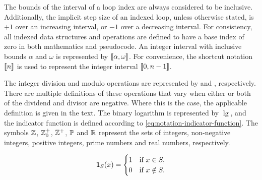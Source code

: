 The bounds of the interval of a loop index are always considered to be inclusive.
Additionally, the implicit step size of an indexed loop, unless otherwise stated, is \( +1 \) over an increasing interval, or \( -1 \) over a decreasing interval.
For consistency, all indexed data structures and operations are defined to have a base index of zero in both mathematics and pseudocode.
An integer interval with inclusive bounds \( \alpha \) and \( \omega \) is represented by \( \llbracket\alpha, \omega\rrbracket \).
For convenience, the shortcut notation \( \llbracket n\rrbracket \) is used to represent the integer interval \( \llbracket0, n - 1\rrbracket \).

The integer division and modulo operations are represented by \Div{} and \Mod{}, respectively.
There are multiple definitions of these operations that vary when either or both of the dividend and divisor are negative.
Where this is the case, the applicable definition is given in the text.
The binary logarithm is represented by \( \lg \), and the indicator function is defined according to \cref{eq:notation-indicator-function}.
The symbols \( \mathbb{Z} \), \( \mathbb{Z}_{0}^{+} \), \( \mathbb{Z}^{+} \), \( \mathbb{P} \) and \( \mathbb{R} \) represent the sets of integers, non-negative integers, positive integers, prime numbers and real numbers, respectively.

\begin{equation}
  \label{eq:notation-indicator-function}
  \operatorname{\mathbf{1}}_{S} (x) = \begin{cases}
    1 & \text{if } x \in S, \\
    0 & \text{if } x \notin S.
  \end{cases}
\end{equation}
